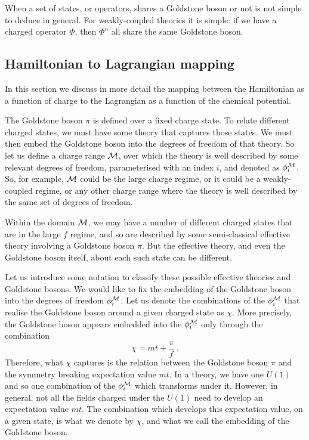 \documentclass[11pt]{article}
\numberwithin{equation}{section}
\newcommand{\be}{\begin{equation}} \newcommand{\ee}{\end{equation}}
\begin{document}
When a set of states, or operators, shares a Goldstone boson or not is not simple to deduce in general. For weakly-coupled theories it is simple: if we have a charged operator $\Phi$, then $\Phi^n$ all share the same Goldstone boson. 

\subsection{Hamiltonian to Lagrangian mapping}
\label{sec:hamtopath}

In this section we discuss in more detail the mapping between the Hamiltonian as a function of charge to the Lagrangian as a function of the chemical potential. 

The Goldstone boson $\pi$ is defined over a fixed charge state. To relate different charged states, we must have some theory that captures those states. We must then embed the Goldstone boson into the degrees of freedom of that theory. So let us define a charge range ${\cal M}$, over which the theory is well described by some relevant degrees of freedom, parameterised with an index $i$, and denoted as $\phi^{\cal M}_i$. So, for example, ${\cal M}$ could be the large charge regime, or it could be a weakly-coupled regime, or any other charge range where the theory is well described by the same set of degrees of freedom. 

Within the domain ${\cal M}$, we may have a number of different charged states that are in the large $f$ regime, and so are described by some semi-classical effective theory involving a Goldstone boson $\pi$. But the effective theory, and even the Goldstone boson itself, about each such state can be different.  

Let us introduce some notation to classify these possible effective theories and Goldstone bosons. We would like to fix the embedding of the Goldstone boson into the degrees of freedom $\phi^{\cal M}_i$. Let us denote the combinations of the $\phi^{\cal M}_i$ that realise the Goldstone boson around a given charged state as $\chi$. More precisely, the Goldstone boson appears embedded into the $\phi^{\cal M}_i$ only through the combination
\be
\chi = m t + \frac{\pi}{f} \;.
\label{chilam}
\ee 
Therefore, what $\chi$ captures is the relation between the Goldstone boson $\pi$ and the symmetry breaking expectation value $m t$. In a theory, we have one $U(1)$ and so one combination of the $\phi^{\cal M}_i$ which transforms under it. However, in general, not all the fields charged under the $U(1)$ need to develop an expectation value $mt$. The combination which develops this expectation value, on a given state, is what we denote by $\chi$, and what we call the embedding of the Goldstone boson. 
\end{document}
